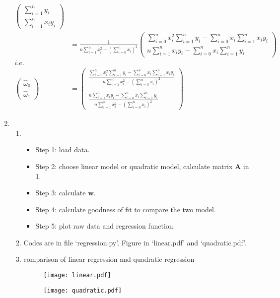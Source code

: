 \documentclass[11pt,letter,notitlepage]{article}
\begin{document}
\begin{solution}
\begin{enumerate}
\begin{align*}
\begin{pmatrix}
				\sum\limits_{i=1}^n{y_i}\\
				\sum\limits_{i=1}^n{x_iy_i}
			\end{pmatrix}\\
			&=\frac{1}{n\sum\limits_{i=1}^n{x_i^2}-(\sum\limits_{i=0}^n{x_i})^2}
			\begin{pmatrix}
				\sum\limits_{i=0}^n{x_i^2}\sum\limits_{i=1}^n{y_i}-\sum\limits_{i=0}^n{x_i}\sum\limits_{i=1}^n{x_iy_i}\\
				n\sum\limits_{i=1}^n{x_iy_i}-\sum\limits_{i=0}^n{x_i}\sum\limits_{i=1}^n{y_i}
			\end{pmatrix}\\
			i.e. ~\\
			\begin{pmatrix}
				\hat{\omega}_0\\
				\hat{\omega}_1
			\end{pmatrix}
			&=
			\begin{pmatrix}
				\frac{\sum\limits_{i=0}^n{x_i^2}\sum\limits_{i=1}^n{y_i}-\sum\limits_{i=0}^n{x_i}\sum\limits_{i=1}^n{x_iy_i}}{n\sum\limits_{i=1}^n{x_i^2}-(\sum\limits_{i=0}^n{x_i})^2}\\\\
				\frac{n\sum\limits_{i=1}^n{x_iy_i}-\sum\limits_{i=0}^n{x_i}\sum\limits_{i=1}^n{y_i}}{n\sum\limits_{i=1}^n{x_i^2}-(\sum\limits_{i=0}^n{x_i})^2}
			\end{pmatrix}
		\end{align*}
		\item
		\begin{enumerate}
			\item 
			\begin{itemize}
			 \item Step 1: load data.
			 \item Step 2: choose linear model or quadratic model, calculate matrix $\mathbf{A}$ in 1.
			 \item Step 3: calculate $\mathbf{w}$.
			 \item Step 4: calculate goodness of fit to compare the two model.
			 \item Step 5: plot raw data and regression function.
			\end{itemize}
			
			\item
			Codes are in file `regression.py'. Figure in `linear.pdf' and `quadratic.pdf'.
			
			\item comparison of linear regression and quadratic regression
			\begin{figure}[H]
				\begin{minipage}{0.45\linewidth}
				 \centering
				 \texttt{[image: linear.pdf]}
				\end{minipage}
				\hfill
				\begin{minipage}{0.45\linewidth}
				\centering
				 \texttt{[image: quadratic.pdf]}
				\end{minipage}
			\end{figure}
			

\end{enumerate}
\end{enumerate}
\end{solution}
\end{document}
